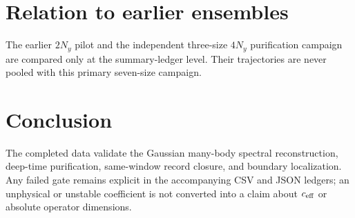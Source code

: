 \documentclass[aps,prb,twocolumn,nofootinbib,superscriptaddress]{revtex4-2}
\begin{document}
\section{Relation to earlier ensembles}
The earlier $2N_y$ pilot and the independent three-size $4N_y$ purification campaign are compared only at
the summary-ledger level. Their trajectories are never pooled with this primary seven-size campaign.

\section{Conclusion}
The completed data validate the Gaussian many-body spectral reconstruction, deep-time purification,
same-window record closure, and boundary localization. Any failed gate remains explicit in the accompanying
CSV and JSON ledgers; an unphysical or unstable coefficient is not converted into a claim about
$c_{\rm eff}$ or absolute operator dimensions.
\end{document}
